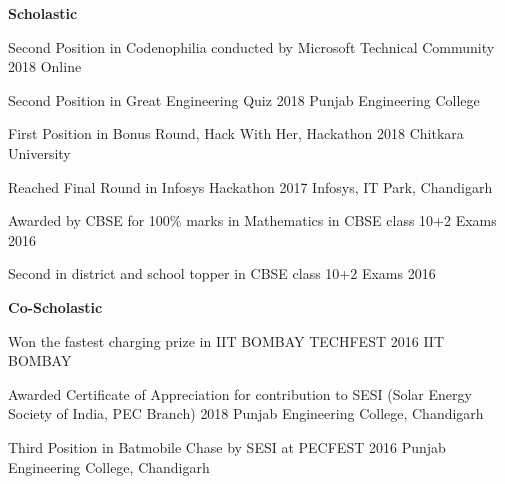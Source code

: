  
\begin{entryzlist}
\Large\textbf{Scholastic}
\vspace{5mm}
\\
\entryz

{Second Position {\normalfont in Codenophilia conducted by Microsoft Technical Community }}
{2018}
{Online}

\entryz

{Second Position {\normalfont in Great Engineering Quiz}}
{2018}
{Punjab Engineering College}

\entryz

{First Position {\normalfont in Bonus Round, Hack With Her, Hackathon}}
{2018}
{Chitkara University}


\entryz

{Reached Final Round {\normalfont in Infosys Hackathon}}
{2017}
{Infosys, IT Park, Chandigarh}



\entryz

{Awarded by CBSE for 100\% marks in Mathematics {\normalfont in CBSE class 10+2 Exams}}
{2016}
{}

\entryz

{Second in district and school topper {\normalfont in CBSE class 10+2 Exams}}
{2016}
{}

\Large\textbf{Co-Scholastic}
\vspace{5mm}
\\

\entryz

{Won the fastest charging prize {\normalfont in IIT BOMBAY TECHFEST }}
{2016}
{IIT BOMBAY}

\entryz

{Awarded Certificate of Appreciation {\normalfont for contribution to SESI (Solar Energy Society of India, PEC Branch)}}
{2018}
{Punjab Engineering College, Chandigarh}

\entryz

{Third Position {\normalfont in Batmobile Chase by SESI at PECFEST}}
{2016}
{Punjab Engineering College, Chandigarh}


\end{entryzlist}
